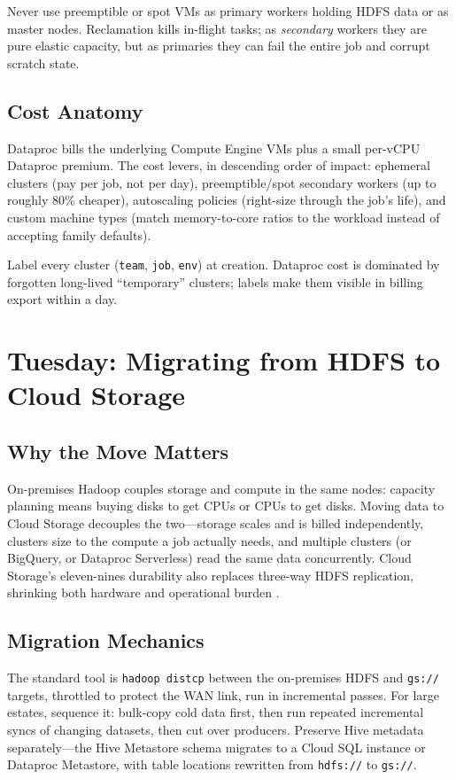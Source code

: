 \begin{pitfall}
Never use preemptible or spot VMs as primary workers holding HDFS data or as master nodes. Reclamation kills in-flight tasks; as \emph{secondary} workers they are pure elastic capacity, but as primaries they can fail the entire job and corrupt scratch state.
\end{pitfall}

\subsection{Cost Anatomy}
Dataproc bills the underlying Compute Engine VMs plus a small per-vCPU Dataproc premium. The cost levers, in descending order of impact: ephemeral clusters (pay per job, not per day), preemptible/spot secondary workers (up to roughly 80\% cheaper), autoscaling policies (right-size through the job's life), and custom machine types (match memory-to-core ratios to the workload instead of accepting family defaults).

\begin{tipbox}
Label every cluster (\texttt{team}, \texttt{job}, \texttt{env}) at creation. Dataproc cost is dominated by forgotten long-lived ``temporary'' clusters; labels make them visible in billing export within a day.
\end{tipbox}

\section{Tuesday: Migrating from HDFS to Cloud Storage}

\subsection{Why the Move Matters}
On-premises Hadoop couples storage and compute in the same nodes: capacity planning means buying disks to get CPUs or CPUs to get disks. Moving data to Cloud Storage decouples the two---storage scales and is billed independently, clusters size to the compute a job actually needs, and multiple clusters (or BigQuery, or Dataproc Serverless) read the same data concurrently. Cloud Storage's eleven-nines durability also replaces three-way HDFS replication, shrinking both hardware and operational burden \cite{googlecloudstorageoverview}.

\subsection{Migration Mechanics}
The standard tool is \texttt{hadoop distcp} between the on-premises HDFS and \texttt{gs://} targets, throttled to protect the WAN link, run in incremental passes. For large estates, sequence it: bulk-copy cold data first, then run repeated incremental syncs of changing datasets, then cut over producers. Preserve Hive metadata separately---the Hive Metastore schema migrates to a Cloud SQL instance or Dataproc Metastore, with table locations rewritten from \texttt{hdfs://} to \texttt{gs://}.

